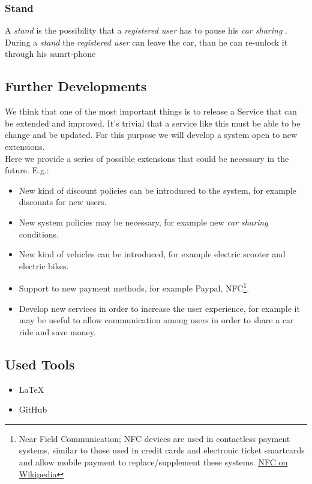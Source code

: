 \documentclass[english]{article}
\newcommand{\carsharing}{\textit {car sharing }}
\newcommand{\registereduser}{\textit {registered user }}
\newcommand{\stand}{\textit{stand }}
\begin{document}
	\subsubsection{Stand}
		A \stand is the possibility that a \registereduser has to pause his \carsharing. During a \stand the \registereduser can leave the car, than he can re-unlock it through his samrt-phone 

\subsection{Further Developments}
	We think that one of the most important things is to release a Service that can be extended and improved. It's trivial that a service like this must be able to be change and be updated.
	For this purpose we will develop a system open to new extensions. \\
	Here we provide a series of possible extensions that could be necessary in the future.
	E.g.:
	\begin{itemize}
		\item New kind of discount policies can be introduced to the system, for example discounts for new users. 
		\item New system policies may be necessary, for example new \carsharing conditions.
		\item New kind of vehicles can be introduced, for example electric scooter and electric bikes.
		\item Support to new payment methods, for example Paypal\textregistered, NFC\footnote{Near Field Communication; NFC devices are used in contactless payment systems, similar to those used in credit cards and electronic ticket smartcards and allow mobile payment to replace/supplement these systems. \href{https://en.wikipedia.org/wiki/Near_field_communication}{NFC on Wikipedia}}.
		\item Develop new services in order to increase the user experience, for example it may be useful to allow communication among users in order to share a car ride and save money.
	\end{itemize}
	\subsection{Used Tools}
	\begin{itemize}
		\item \LaTeX\\
		\item GitHub\\
	\end{itemize}
\end{document}
